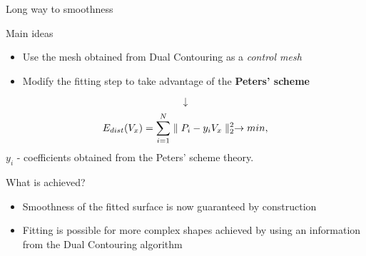 \begin{frame}{Long way to smoothness}
\begin{block}{Main ideas}
\begin{itemize}
\item Use the mesh obtained from Dual Contouring as a \textit{control mesh}
\item Modify the fitting step to take advantage of the \textbf{Peters' scheme}
\end{itemize}
\end{block}
$$\downarrow$$
\begin{equation}
E_{dist}(V_{x}) = \sum_{i=1}^{N}\norm{P_{i} - y_{i}V_{x}}^{2} \rightarrow min,
\end{equation}
$y_{i}$ - coefficients obtained from the Peters' scheme theory.
\begin{block}{What is achieved?}
\begin{itemize}
\item Smoothness of the fitted surface is now guaranteed by construction
\item Fitting is possible for more complex shapes achieved by using an information from the Dual Contouring algorithm
\end{itemize}
\end{block}
\end{frame}
